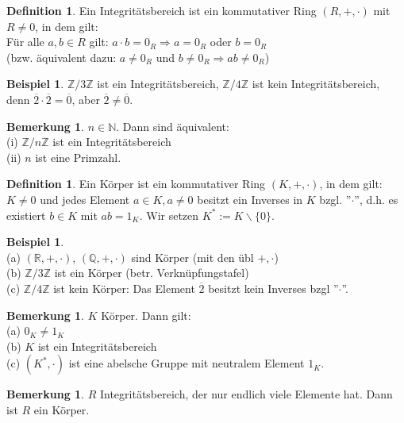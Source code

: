 \documentclass[10pt,a4paper,numbers=endperiod]{scrartcl}
\theoremstyle{definition}
\newtheorem{defi}[satz]{Definition}
\newtheorem{bem}[satz]{Bemerkung}
\newtheorem{bsp}[satz]{Beispiel}
\begin{document}
\begin{defi}
	Ein Integritätsbereich ist ein kommutativer Ring $(R,+, \cdot)$ mit $R \neq0$, in dem gilt:\\
	Für alle $a,b \in R$ gilt: $a \cdot b = 0_R \Rightarrow a = 0_R$ oder $b = 0_R$\\ (bzw. äquivalent dazu: $a \neq 0_R$ und $b \neq 0_R \Rightarrow ab \neq 0_R$)
\end{defi}

\begin{bsp}
	$\mathbb{Z}/3\mathbb{Z}$ ist ein Integritätsbereich, $\mathbb{Z}/4\mathbb{Z}$ ist kein Integritätsbereich, denn $\overline{2} \cdot \overline{2}=\overline{0}$, aber $\overline{2} \neq \overline{0}$.
\end{bsp}

\begin{bem}
	$n \in \mathbb{N}$. Dann sind äquivalent:\\
	(i) $\mathbb{Z}/n\mathbb{Z}$ ist ein Integritätsbereich\\
	(ii) $n$ ist eine Primzahl. 
\end{bem}

\begin{defi}
	Ein Körper ist ein kommutativer Ring $(K,+, \cdot)$, in dem gilt:\\
	$K \neq 0$ und jedes Element $a \in K, a \neq 0$ besitzt ein Inverses in $K$ bzgl. ''$\cdot$'', d.h. es existiert $b \in K$ mit $ab=1_K$. Wir setzen $K^* := K \backslash\{0\}$.
\end{defi}

\begin{bsp}
	$ $\\
	(a) $(\mathbb{R},+,\cdot)$, $(\mathbb{Q},+,\cdot)$ sind Körper (mit den übl $+, \cdot$)\\
	(b) $\mathbb{Z}/3\mathbb{Z}$ ist ein Körper (betr. Verknüpfungstafel)\\
	(c) $\mathbb{Z}/4\mathbb{Z}$ ist kein Körper: Das Element $\overline{2}$ besitzt kein Inverses bzgl ''$\cdot$''.
\end{bsp}

\begin{bem}
	$K$ Körper. Dann gilt:\\
	(a) $0_K \neq 1_K$\\
	(b) $K$ ist ein Integritätsbereich\\
	(c) $(K^*, \cdot)$ ist eine abelsche Gruppe mit neutralem Element $1_K$.
\end{bem}

\begin{bem}
	$R$ Integritätsbereich, der nur endlich viele Elemente hat. Dann ist $R$ ein Körper.
\end{bem}
\end{document}
